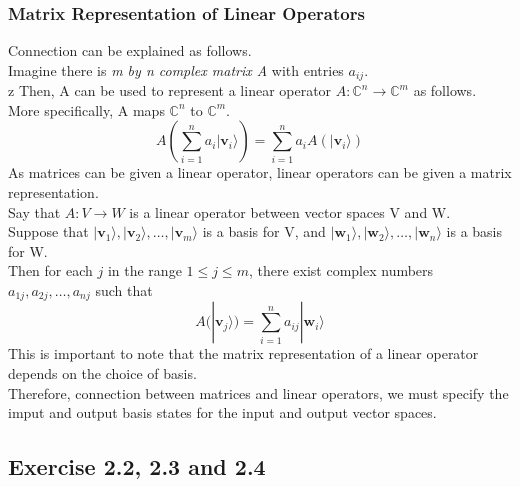 \documentclass{article}
\begin{document}
\subsubsection{Matrix Representation of Linear Operators}
Connection can be explained as follows. \\
Imagine there is \textit{m by n complex matrix A} with entries $a_{ij}$. \\z
Then, A can be used to represent a linear operator $A: \mathbb{C}^n \rightarrow \mathbb{C}^m$ as follows. \\
More specifically, A maps $\mathbb{C}^n$ to $\mathbb{C}^m$. \\
\begin{equation}
    A(\sum_{i=1}^n a_i|\mathbf{v}_i\rangle) = \sum_{i=1}^n a_i A(|\mathbf{v}_i\rangle)
\end{equation}
As matrices can be given a linear operator, linear operators can be given a matrix representation. \\
Say that $A: V \rightarrow W$ is a linear operator between vector spaces V and W. \\
Suppose that $|\mathbf{v}_1\rangle, |\mathbf{v}_2\rangle, \ldots, |\mathbf{v}_m\rangle$ is a basis for V,
and $|\mathbf{w}_1\rangle, |\mathbf{w}_2\rangle, \ldots, |\mathbf{w}_n\rangle$ is a basis for W. \\
Then for each $j$ in the range $1 \leq j \leq m$, there exist complex numbers $a_{1j}, a_{2j}, \ldots, a_{nj}$ such that
\begin{equation}
    A(|\mathbf{v}_j\rangle) = \sum_{i=1}^n a_{ij} |\mathbf{w}_i\rangle
\end{equation}
This is important to note that the matrix representation of a linear operator depends on the choice of basis. \\
Therefore, connection between matrices and linear operators, we must specify the imput and output basis states for 
the input and output vector spaces. \\
\subsection{Exercise 2.2, 2.3 and 2.4}
\end{document}
